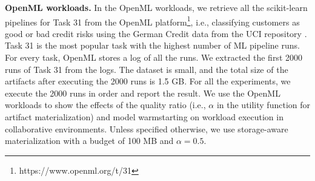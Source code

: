 \textbf{OpenML workloads.} In the OpenML workloads, we retrieve all the scikit-learn pipelines for Task 31 from the OpenML platform\footnote{https://www.openml.org/t/31}, i.e., classifying customers as good or bad credit risks using the German Credit data from the UCI repository \cite{asuncion2007uci}.
Task 31 is the most popular task with the highest number of ML pipeline runs.
For every task, OpenML stores a log of all the runs.
We extracted the first 2000 runs of Task 31 from the logs.
The dataset is small, and the total size of the artifacts after executing the 2000 runs is 1.5 GB.
For all the experiments, we execute the 2000 runs in order and report the result.
We use the OpenML workloads to show the effects of the quality ratio (i.e., $\alpha$ in the utility function for artifact materialization) and model warmstarting on workload execution in collaborative environments.
Unless specified otherwise,  we use storage-aware materialization with a budget of 100 MB and $\alpha=0.5$.

